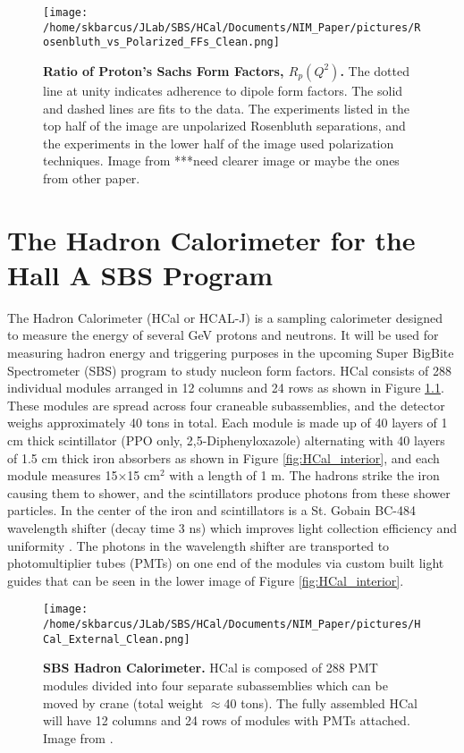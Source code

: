 \documentclass[oneside]{book}   %
\begin{document}
	\begin{figure}[!ht]
	\begin{center}
	\texttt{[image: /home/skbarcus/JLab/SBS/HCal/Documents/NIM\_Paper/pictures/Rosenbluth\_vs\_Polarized\_FFs\_Clean.png]}
	\end{center}
	\caption{
	{\bf{Ratio of Proton's Sachs Form Factors, $R_p(Q^2)$.}} The dotted line at unity indicates adherence to dipole form factors. The solid and dashed lines are fits to the data. The experiments listed in the top half of the image are unpolarized Rosenbluth separations, and the experiments in the lower half of the image used polarization techniques. Image from \cite{cisbani_2014}***need clearer image or maybe the ones from other paper.}
	\label{fig:polarization_vs_rosenbluth}
	\end{figure}	

 
\chapter{The Hadron Calorimeter for the Hall A SBS Program}

The Hadron Calorimeter (HCal or HCAL-J) is a sampling calorimeter designed to measure the energy of several GeV protons and neutrons. It will be used for measuring hadron energy and triggering purposes in the upcoming Super BigBite Spectrometer (SBS) program to study nucleon form factors. HCal consists of 288 individual modules arranged in 12 columns and 24 rows as shown in Figure \ref{fig:HCal}. These modules are spread across four craneable subassemblies, and the detector weighs approximately 40 tons in total. Each module is made up of 40 layers of 1 cm thick scintillator (PPO only, 2,5-Diphenyloxazole) alternating with 40 layers of 1.5 cm thick iron absorbers as shown in Figure \ref{fig:HCal_interior}, and each module measures 15$\times$15 cm$^2$ with a length of 1 m. The hadrons strike the iron causing them to shower, and the scintillators produce photons from these shower particles. In the center of the iron and scintillators is a St. Gobain BC-484 wavelength shifter (decay time 3 ns) which improves light collection efficiency and uniformity \cite{brio_2018}. The photons in the wavelength shifter are transported to photomultiplier tubes (PMTs) on one end of the modules via custom built light guides that can be seen in the lower image of Figure \ref{fig:HCal_interior}.\\

	\begin{figure}[!ht]
	\begin{center}
	\texttt{[image: /home/skbarcus/JLab/SBS/HCal/Documents/NIM\_Paper/pictures/HCal\_External\_Clean.png]}
	\end{center}
	\caption{
	{\bf{SBS Hadron Calorimeter.}} HCal is composed of 288 PMT modules divided into four separate subassemblies which can be moved by crane (total weight $\approx$40 tons). The fully assembled HCal will have 12 columns and 24 rows of modules with PMTs attached. Image from \cite{brio_2018}.}
	\label{fig:HCal}
	\end{figure}	
	
\end{document}

